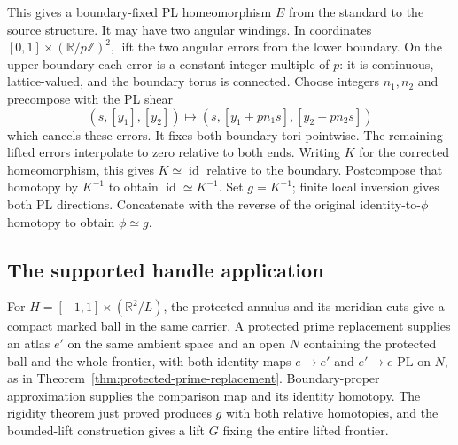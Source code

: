 This gives a boundary-fixed PL homeomorphism $E$ from the standard to
the source structure. It may have two angular windings. In coordinates
$[0,1]\times(\mathbb R/p\mathbb Z)^2$, lift the two angular errors from
the lower boundary. On the upper boundary each error is a constant
integer multiple of $p$: it is continuous, lattice-valued, and the
boundary torus is connected. Choose integers $n_1,n_2$ and precompose
with the PL shear
\[
 (s,[y_1],[y_2])\longmapsto
 (s,[y_1+p n_1s],[y_2+p n_2s])
\]
which cancels these errors. It fixes both boundary tori pointwise.
The remaining lifted errors interpolate to zero relative to both ends.
Writing $K$ for the corrected homeomorphism, this gives
$K\simeq\operatorname{id}$ relative to the boundary.
Postcompose that homotopy by $K^{-1}$ to obtain
$\operatorname{id}\simeq K^{-1}$. Set $g=K^{-1}$; finite local inversion
gives both PL directions. Concatenate with the reverse of the original
identity-to-$\phi$ homotopy to obtain $\phi\simeq g$.

\subsection{The supported handle application}

For $H=[-1,1]\times(\mathbb R^2/L)$, the protected annulus and its meridian
cuts give a compact marked ball in the same carrier.  A protected prime
replacement supplies an atlas $e'$ on the same ambient space and an open $N$
containing the
protected ball and the whole frontier, with both identity maps $e\to e'$ and
$e'\to e$ PL on $N$, as in
Theorem~\ref{thm:protected-prime-replacement}. Boundary-proper approximation
supplies the comparison map and its identity homotopy. The rigidity theorem
just proved produces $g$ with both relative homotopies, and
the bounded-lift construction gives a lift $G$ fixing the entire lifted
frontier.

